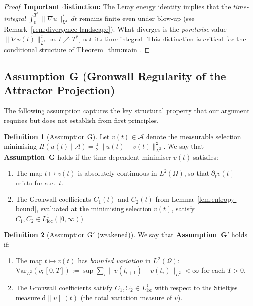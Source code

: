 \documentclass[12pt,a4paper]{article}
\theoremstyle{definition}
\newtheorem{definition}{Definition}[section]
\theoremstyle{plain}
\theoremstyle{remark}
\begin{document}
\begin{proof}
\medskip
\noindent\textbf{Important distinction:}\;
The Leray energy identity implies that the \emph{time-integral}
$\int_0^{T^*}\|\nabla u\|_{L^2}^2\,dt$ remains finite even under
blow-up (see Remark~\ref{rem:divergence-landscape}).  What diverges
is the \emph{pointwise} value $\|\nabla u(t)\|_{L^2}^2$ as
$t \nearrow T^*$, not its time-integral.  This distinction is
critical for the conditional structure of Theorem~\ref{thm:main}.
\end{proof}

\subsection*{Assumption G (Gronwall Regularity of the Attractor Projection)}
\label{sec:assumption-G}

The following assumption captures the key structural property that our
argument requires but does not establish from first principles.

\begin{definition}[Assumption G]\label{ass:G}
Let $v(t) \in \mathcal{A}$ denote the measurable selection minimising
$H(u(t)\mid\mathcal{A}) = \tfrac{1}{2}\|u(t)-v(t)\|_{L^2}^2$.  We say that
\textbf{Assumption~G} holds if the time-dependent minimiser $v(t)$ satisfies:
\begin{enumerate}
    \item[\emph{(G1)}] The map $t \mapsto v(t)$ is absolutely continuous in
          $L^2(\Omega)$, so that $\partial_t v(t)$ exists for a.e.\ $t$.
    \item[\emph{(G2)}] The Gronwall coefficients $C_1(t)$ and $C_2(t)$ from
          Lemma~\ref{lem:entropy-bound}, evaluated at the minimising selection
          $v(t)$, satisfy $C_1, C_2 \in L^1_{\mathrm{loc}}([0,\infty))$.
\end{enumerate}
\end{definition}

\begin{definition}[Assumption G$'$ (weakened)]\label{ass:Gprime}
We say that \textbf{Assumption~G$'$} holds if:
\begin{enumerate}
    \item[\emph{(G1$'$)}] The map $t \mapsto v(t)$ has \emph{bounded variation}
          in $L^2(\Omega)$: $\mathrm{Var}_{L^2}(v; [0,T]) :=
          \sup \sum_{i} \|v(t_{i+1}) - v(t_i)\|_{L^2} < \infty$ for each
          $T > 0$.
    \item[\emph{(G2$'$)}] The Gronwall coefficients satisfy
          $C_1, C_2 \in L^1_{\mathrm{loc}}$ with respect to the Stieltjes
          measure $\mathrm{d}\|v\|(t)$ (the total variation measure of $v$).
\end{enumerate}
\end{definition}
\end{document}
